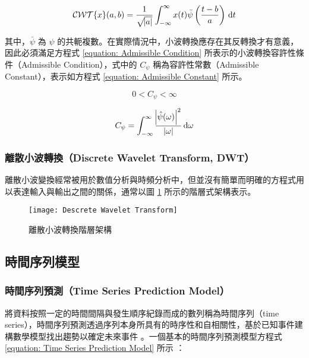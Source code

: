 \begin{equation}\label{equation: Continuous Wavelet Transform}
  \mathcal{CWT}\{ x \} (a, b) = \frac{1}{\sqrt{\abs{a}}} \int_{-\infty}^{\infty} x(t) \bar{\psi} \left( \frac{t - b}{a} \right) \, \mathop{}\!\mathrm{d} t
\end{equation}

其中，$\bar{\psi}$ 為 $\psi$ 的共軛複數。在實際情況中，小波轉換應存在其反轉換才有意義，因此必須滿足方程式 \eqref{equation: Admissible Condition} 所表示的小波轉換容許性條件（Admissible Condition），式中的 $C_{\psi}$ 稱為容許性常數（Admissible Constant），表示如方程式 \eqref{equation: Admissible Constant} 所示。

\begin{equation}\label{equation: Admissible Condition}
  0 < C_{\psi} < \infty
\end{equation}

\begin{equation}\label{equation: Admissible Constant}
  C_{\psi} = \int_{-\infty}^{\infty} \frac{\abs{\hat{\psi} (\omega)}^2}{|\omega|} \mathop{}\!\mathrm{d} \omega
\end{equation}

\subsubsection{離散小波轉換（Discrete Wavelet Transform, DWT）}

離散小波變換經常被用於數值分析與時頻分析中，但並沒有簡單而明確的方程式用以表達輸入與輸出之間的關係，通常以圖 \ref{figure: Descrete Wavelet Transform} 所示的階層式架構表示。

\begin{figure}[htbp]
  \centering
  \texttt{[image: Descrete Wavelet Transform]}
  \caption{離散小波轉換階層架構}
  \label{figure: Descrete Wavelet Transform}
\end{figure}

\subsection{時間序列模型}

\subsubsection{時間序列預測（Time Series Prediction Model）}

將資料按照一定的時間間隔與發生順序紀錄而成的數列稱為時間序列（time series），時間序列預測透過序列本身所具有的時序性和自相關性，基於已知事件建構數學模型找出趨勢以確定未來事件 \cite{Wang2012}。一個基本的時間序列預測模型方程式 \eqref{equation: Time Series Prediction Model} 所示 \cite{box2015time}：

